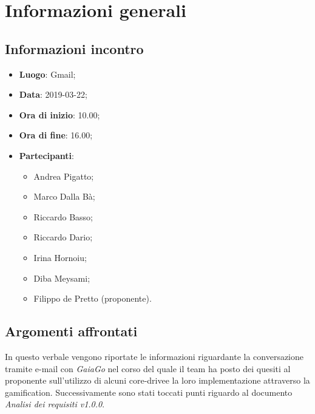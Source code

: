 \section{Informazioni generali}

\subsection{Informazioni incontro}
\begin{itemize}
\item \textbf{Luogo}: Gmail;
\item \textbf{Data}: 2019-03-22;
\item \textbf{Ora di inizio}: 10.00;
\item \textbf{Ora di fine}: 16.00;
\item \textbf{Partecipanti}: 
\begin{itemize}
	\item Andrea Pigatto;
	\item Marco Dalla Bà;
	\item Riccardo Basso;
	\item Riccardo Dario;
	\item Irina Hornoiu;
	\item Diba Meysami;
	\item Filippo de Pretto (proponente).
\end{itemize}
\end{itemize}

\subsection{Argomenti affrontati}
In questo verbale vengono riportate le informazioni riguardante la conversazione tramite e-mail con \textit{GaiaGo} nel corso del quale il team ha posto dei quesiti al proponente sull'utilizzo di alcuni core-drive\glosp e la loro implementazione attraverso la gamification\glo. Successivamente sono stati toccati punti riguardo al documento \textit{Analisi dei requisiti v1.0.0}.

